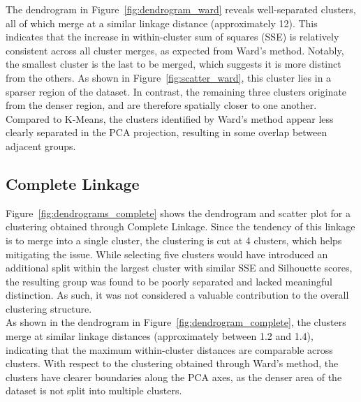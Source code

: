The dendrogram in Figure~\ref{fig:dendrogram_ward} reveals well-separated clusters, all of which merge at a
similar linkage distance (approximately 12). This indicates that the increase in within-cluster sum of
squares (SSE) is relatively consistent across all cluster merges, as expected from Ward's method.
Notably, the smallest cluster is the last to be merged, which suggests it is more distinct from the others.
As shown in Figure~\ref{fig:scatter_ward}, this cluster lies in a sparser region of the dataset.
In contrast, the remaining three clusters originate from the denser region, and are therefore spatially
closer to one another.
Compared to K-Means, the clusters identified by Ward's method appear less clearly separated in the PCA
projection, resulting in some overlap between adjacent groups.



\subsection{Complete Linkage}
Figure~\ref{fig:dendrograms_complete} shows the dendrogram and scatter plot for a clustering obtained
through Complete Linkage.
Since the tendency of this linkage is to merge into a single cluster, the clustering is cut at 4 clusters,
which helps mitigating the issue. While selecting five clusters would have introduced an additional split
within the largest cluster with similar SSE and Silhouette scores, the resulting group was found to be
poorly separated and lacked meaningful distinction.
As such, it was not considered a valuable contribution to the overall clustering structure.\\

As shown in the dendrogram in Figure~\ref{fig:dendrogram_complete}, the clusters merge at similar linkage
distances (approximately between 1.2 and 1.4), indicating that the maximum within-cluster distances are
comparable across clusters. With respect to the clustering obtained through Ward's method, the clusters
have clearer boundaries along the PCA axes, as the denser area of the dataset is not split into multiple
clusters.\\

